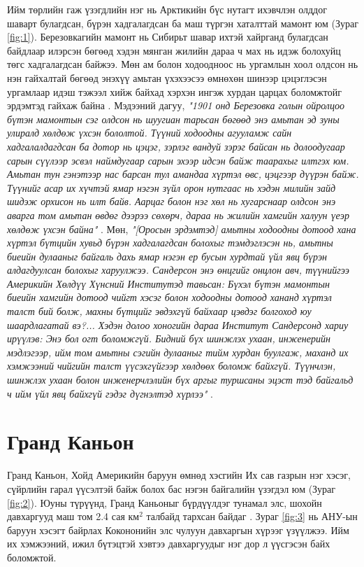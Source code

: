 \documentclass[10pt,twocolumn,letterpaper]{article}
\begin{document}
Ийм төрлийн гаж үзэгдлийн нэг нь Арктикийн бүс нутагт ихэвчлэн олддог шаварт булагдсан, бүрэн хадгалагдсан ба маш түргэн хаталттай мамонт юм (Зураг \ref{fig:1}). Березовкагийн мамонт нь Сибирьт шавар ихтэй хайрганд булагдсан байдлаар илэрсэн бөгөөд хэдэн мянган жилийн дараа ч мах нь идэж болохуйц төгс хадгалагдсан байжээ. Мөн ам болон ходоодноос нь ургамлын хоол олдсон нь нэн гайхалтай бөгөөд энэхүү амьтан үхэхээсээ өмнөхөн шинээр цэцэглэсэн ургамлаар идэш тэжээл хийж байхад хэрхэн ингэж хурдан царцах боломжтойг эрдэмтэд гайхаж байна \cite{17}. Мэдээний дагуу, \textit{"1901 онд Березовка голын ойролцоо бүтэн мамонтын сэг олдсон нь шуугиан тарьсан бөгөөд энэ амьтан эд зуны улиралд хөлдөж үхсэн бололтой. Түүний ходоодны агууламж сайн хадгалалдагдсан ба дотор нь цэцэг, зэрлэг вандуй зэрэг байсан нь долоодугаар сарын сүүлээр эсвэл наймдугаар сарын эхээр идсэн байж таарахыг илтгэх юм. Амьтан тун гэнэтээр нас барсан тул амандаа хүртэл өвс, цэцгээр дүүрэн байж. Түүнийг асар их хүчтэй ямар нэгэн зүйл орон нутгаас нь хэдэн милийн зайд шидэж орхисон нь илт байв. Аарцаг болон нэг хөл нь хугарснаар олдсон энэ аварга том амьтан өвдөг дээрээ сөхөрч, дараа нь жилийн хамгийн халуун үеэр хөлдөж үхсэн байна"} \cite{18}. Мөн, \textit{"[Оросын эрдэмтэд] амьтны ходоодны дотоод хана хүртэл бүтцийн хувьд бүрэн хадгалагдсан болохыг тэмдэглэсэн нь, амьтны биеийн дулааныг байгаль дахь ямар нэгэн ер бусын хурдтай үйл явц бүрэн алдагдуулсан болохыг харуулжээ. Сандерсон энэ өнцгийг онцлон авч, түүнийгээ Америкийн Хөлдүү Хүнсний Институтэд тавьсан: Бүхэл бүтэн мамонтын биеийн хамгийн дотоод чийгт хэсэг болон ходоодны дотоод хананд хүртэл талст бий болж, махны бүтцийг эвдэхгүй байхаар цэвдэг болгоход юу шаардлагатай вэ?... Хэдэн долоо хоногийн дараа Институт Сандерсонд хариу ирүүлэв: Энэ бол огт боломжгүй. Бидний бүх шинжлэх ухаан, инженерийн мэдлэгээр, ийм том амьтны сэгийн дулааныг тийм хурдан буулгаж, маханд их хэмжээний чийгийн талст үүсэхгүйгээр хөлдөөх боломж байхгүй. Түүнчлэн, шинжлэх ухаан болон инженерчлэлийн бүх аргыг туршсаны эцэст тэд байгальд ч ийм үйл явц байхгүй гэдэг дүгнэлтэд хүрлээ"} \cite{19}.

\section{Гранд Каньон}

Гранд Каньон, Хойд Америкийн баруун өмнөд хэсгийн Их сав газрын нэг хэсэг, сүйрлийн гарал үүсэлтэй байж болох бас нэгэн байгалийн үзэгдэл юм (Зураг \ref{fig:2}). Юуны түрүүнд, Гранд Каньоныг бүрдүүлдэг тунамал элс, шохойн давхаргууд маш том 2.4 сая км$^2$ талбайд тархсан байдаг \cite{21}. Зураг \ref{fig:3} нь АНУ-ын баруун хэсэгт байрлах Кокононийн элс чулуун давхаргын хүрээг үзүүлжээ. Ийм их хэмжээний, ижил бүтэцтэй хэвтээ давхаргуудыг нэг дор л үүсгэсэн байх боломжтой.
\end{document}
